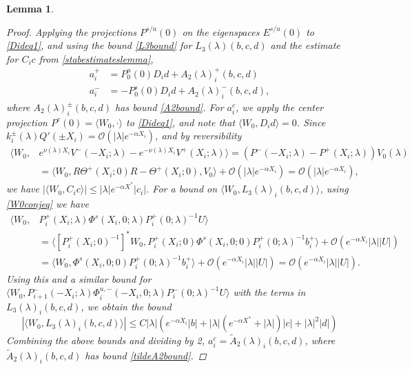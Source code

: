 \documentclass[10pt,reqno]{amsart}
\theoremstyle{plain}
\newtheorem{lemma}[theorem]{Lemma}
\theoremstyle{definition}
\theoremstyle{remark}
\numberwithin{theorem}{section}
\numberwithin{equation}{section}
\begin{document}
\begin{lemma}
\begin{proof}
Applying the projections $P^{s/u}(0)$ on the eigenspaces $E^{s/u}(0)$ to \eqref{Dideq1}, and using the bound \cref{L3bound} for $L_3(\lambda)(b, c, d)$ and the estimate for $C_i c$ from \cref{stabestimateslemma},
\begin{align*}
a_i^+ &= P_0^u(0) D_i d + A_2(\lambda)_i^+(b, c, d) \\
a_i^- &= -P_0^s(0) D_i d + A_2(\lambda)_i^-(b, c, d),
\end{align*}
where $A_2(\lambda)_i^\pm(b, c, d)$ has bound \cref{A2bound}. For $a_i^c$, we apply the center projection $P^c(0) = \langle W_0, \cdot \rangle$ to \eqref{Dideq1}, and note that $\langle W_0, D_i d\rangle = 0$. Since $k_i^\pm(\lambda)Q'(\pm X_i) = \mathcal{O}(|\lambda|e^{-\alpha X_i})$, and by reversibility
\begin{align*}
\langle W_0, &e^{\nu(\lambda) X_i} V^-(-X_i; \lambda) - e^{-\nu(\lambda) X_i} V^+(X_i; \lambda) \rangle = \left( P^-(-X_i; \lambda) - P^+(X_i; \lambda) \right) V_0(\lambda) \\
&= \langle W_0, R \Theta^+(X_i; 0) R - \Theta^+(X_i; 0), V_0 \rangle + \mathcal{O}(|\lambda|e^{-\alpha X_i}) = \mathcal{O}(|\lambda|e^{-\alpha X_i}),
\end{align*}
we have $|\langle W_0, C_i c\rangle| \leq |\lambda|e^{-\alpha X^*}|c_i|$. For a bound on $\langle W_0, L_3(\lambda)_i(b,c,d) \rangle$, using \cref{W0conjeq} we have
\begin{align*}
\langle W_0, &P_i^+(X_i; \lambda)\Phi^s(X_i, 0; \lambda) P_i^+(0; \lambda)^{-1} U \rangle
\\
&= \langle [P_i^+(X_i; 0)^{-1}]^* W_0, P_i^+(X_i; 0)\Phi^s(X_i, 0; 0) P_i^+(0; \lambda)^{-1} b_i^+ \rangle + \mathcal{O}(e^{-\alpha X_i} |\lambda||U|) \\
&= \langle W_0, \Phi^s(X_i, 0; 0)  P_i^+(0; \lambda)^{-1} b_i^+ \rangle + \mathcal{O}(e^{-\alpha X_i} |\lambda||U|) = \mathcal{O}(e^{-\alpha X_i} |\lambda||U|).
\end{align*}
Using this and a similar bound for $\langle W_0, P_{i+1}^-(-X_i; \lambda)\Phi_i^{u,-}(-X_i, 0; \lambda) P_i^-(0; \lambda)^{-1} U \rangle$ with the terms in $L_3(\lambda)_i(b, c, d)$, we obtain the bound
\begin{equation}\label{W0L3bound}
|\langle W_0, L_3(\lambda)_i(b, c, d) \rangle| \leq C |\lambda| \left( e^{-\alpha X_i} |b| + |\lambda|(e^{-\alpha X^*}+ |\lambda|) |c| + |\lambda|^2 |d| \right)
\end{equation}
Combining the above bounds and dividing by 2, $a_i^c = \tilde{A}_2(\lambda)_i(b, c, d)$, where $\tilde{A}_2(\lambda)_i(b, c, d)$ has bound \cref{tildeA2bound}.
\end{proof}
\end{lemma}
\end{document}
